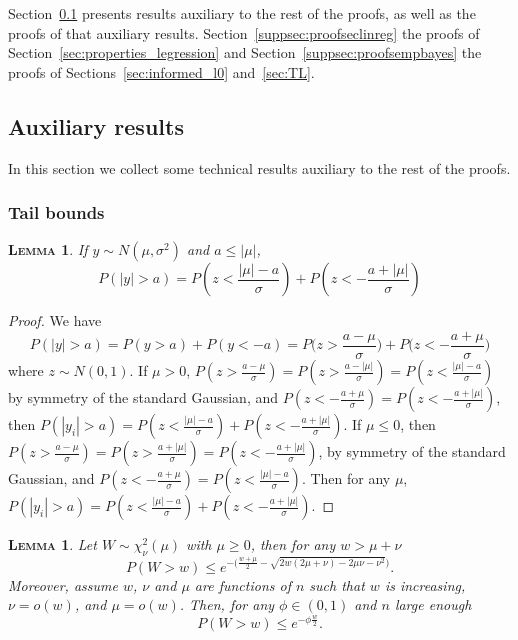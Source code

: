 \documentclass[
  12pt]{article}
\newtheorem{lem}[thm]{\textsc{Lemma}}
\begin{document}
Section~\ref{suppsec:auxiliary} presents results auxiliary to the rest of the proofs, as well as the proofs of that auxiliary results. Section~\ref{suppsec:proofseclinreg} the proofs of Section~\ref{sec:properties_legression} and Section~\ref{suppsec:proofsempbayes} the proofs of Sections~\ref{sec:informed_l0} and~\ref{sec:TL}. 

\subsection{Auxiliary results}\label{suppsec:auxiliary}

In this section we collect some technical results auxiliary to the rest of the proofs.

\subsubsection{Tail bounds}

\begin{lem}\label{lemma:3tailbounds}
If $y\sim N(\mu,\sigma^2)$ and $a\leq|\mu|$, $$P(|y|>a)  = P\left(z<\frac{|\mu|-a}{\sigma}\right) + P\left(z<-\frac{a+|\mu|}{\sigma}\right)$$
\end{lem}

\begin{proof} We have
$$P(|y|>a) = P(y>a) + P(y<-a) = P\Big(z>\frac{a-\mu}{\sigma}\Big) + P\Big(z<-\frac{a+\mu}{\sigma}\Big)$$
where $z\sim N(0,1)$. If $\mu>0$, $P(z>\frac{a-\mu}{\sigma})  =  P(z>\frac{a-|\mu|}{\sigma})= P(z<\frac{|\mu|-a}{\sigma})$ by symmetry of the standard Gaussian, and $P(z<-\frac{a+\mu}{\sigma})=P(z<-\frac{a+|\mu|}{\sigma})$, then $P(|y_i|>a) =  P(z<\frac{|\mu|-a}{\sigma}) + P(z<-\frac{a+|\mu|}{\sigma})$.
If $\mu\leq0$, then $P(z>\frac{a-\mu}{\sigma})=P(z>\frac{a+|\mu|}{\sigma})=P(z<-\frac{a+|\mu|}{\sigma})$, by symmetry of the standard Gaussian, and $P(z<-\frac{a+\mu}{\sigma})=P(z<\frac{|\mu|-a}{\sigma})$. Then for any $\mu$, $P(|y_i|>a)  = P(z<\frac{|\mu|-a}{\sigma}) + P(z<-\frac{a+|\mu|}{\sigma}) $.
\end{proof}


\begin{lem}\label{lemma:s1s3}
Let $W\sim\chi_{\nu}^2(\mu)$ with $\mu \geq 0$, then for any $w>\mu+\nu$
$$P(W > w) \leq e^{-\big(\frac{w+\mu}{2}  - \sqrt{2w( 2 \mu+ \nu)-2 \mu \nu - \nu^2 } \big)}. $$
Moreover, assume $w$, $\nu$ and $\mu$ are functions of $n$ such that $w$ is increasing, $\nu=o(w)$, and $\mu=o(w)$. Then, for any $\phi\in(0,1)$ and $n$ large enough
$$P(W > w)  \leq  e^{-\phi\frac{w}{2}}.$$
\end{lem}
\end{document}
